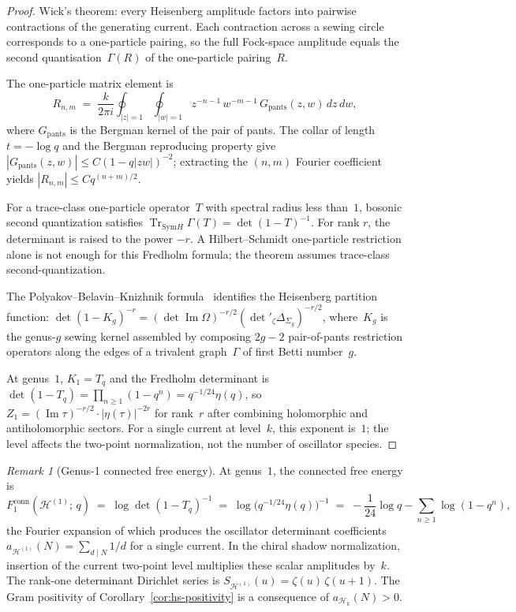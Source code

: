 \documentclass[11pt,reqno]{amsart}
\theoremstyle{definition}
\theoremstyle{remark}
\newtheorem{remark}[theorem]{Remark}
\newcommand{\cH}{\mathcal{H}}
\newcommand{\Sym}{\mathrm{Sym}}
\newcommand{\GG}{\Gamma}
\numberwithin{equation}{section}
\begin{document}
\begin{proof}
Wick's theorem: every Heisenberg amplitude factors into
pairwise contractions of the generating current.  Each
contraction across a sewing circle corresponds to a
one-particle pairing, so the full Fock-space amplitude
equals the second quantisation~$\GG(R)$ of the one-particle
pairing~$R$.

The one-particle matrix element is
\[
R_{n,m}
\;=\;
\frac{k}{2\pi i}\oint_{|z| = 1}
\oint_{|w| = 1}
z^{-n-1}\, w^{-m-1}\,
G_{\mathrm{pants}}(z, w)\, dz\, dw,
\]
where $G_{\mathrm{pants}}$ is the Bergman kernel of the pair
of pants.  The collar of length $t = -\log q$ and the Bergman
reproducing property give
$|G_{\mathrm{pants}}(z, w)| \leq C(1 - q|zw|)^{-2}$;
extracting the $(n,m)$ Fourier coefficient yields
$|R_{n,m}| \leq C q^{(n+m)/2}$.

For a trace-class one-particle operator~$T$ with spectral radius
less than~$1$, bosonic second quantization satisfies
$\operatorname{Tr}_{\Sym H}\Gamma(T)=\det(1-T)^{-1}$. For rank
$r$, the determinant is raised to the power $-r$. A
Hilbert--Schmidt one-particle restriction alone is not enough for
this Fredholm formula; the theorem assumes trace-class
second-quantization.

The Polyakov--Belavin--Knizhnik formula~\cite{BK86}
identifies the Heisenberg partition function:
$\det(1 - K_g)^{-r}
= (\det\operatorname{Im}\Omega)^{-r/2}
(\det{}'_\zeta \Delta_{\Sigma_g})^{-r/2}$,
where~$K_g$ is the genus-$g$ sewing kernel assembled by
composing $2g - 2$ pair-of-pants restriction operators along
the edges of a trivalent graph~$\GG$ of first Betti number~$g$.

At genus~$1$, $K_1 = T_q$ and the Fredholm determinant is
$\det(1 - T_q) = \prod_{n \geq 1}(1 - q^n) =
q^{-1/24}\eta(q)$,
so $Z_1 = (\operatorname{Im}\tau)^{-r/2}
\cdot |\eta(\tau)|^{-2r}$
for rank~$r$ after combining holomorphic and antiholomorphic
sectors. For a single current at level~$k$, this exponent is~$1$;
the level affects the two-point normalization, not the number of
oscillator species.
\end{proof}

\begin{remark}[Genus-1 connected free energy]
\label{rem:genus-1-free-energy}
At genus~$1$, the connected free energy is
\[
F_1^{\mathrm{conn}}(\cH^{(1)};\,q)
\;=\;
\log\det(1 - T_q)^{-1}
\;=\;
\log\bigl(q^{-1/24}\eta(q)\bigr)^{-1}
\;=\;
-\frac{1}{24}\log q
- \sum_{n \geq 1}\log(1 - q^n),
\]
the Fourier expansion of which produces the oscillator determinant
coefficients $a_{\cH^{(1)}}(N) = \sum_{d \mid N} 1/d$ for a single
current. In the chiral shadow normalization, insertion of the
current two-point level multiplies these scalar amplitudes by~$k$.
The rank-one determinant
Dirichlet series is
$S_{\cH^{(1)}}(u) = \zeta(u)\,\zeta(u+1)$.  The Gram
positivity of Corollary~\ref{cor:hs-positivity} is a
consequence of $a_{\cH_k}(N) > 0$.
\end{remark}
\end{document}
